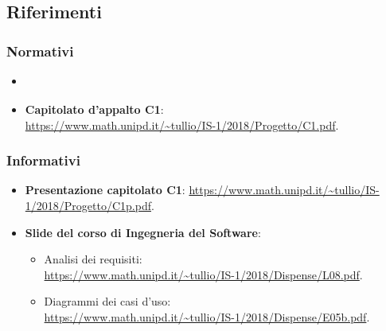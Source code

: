 	\subsection{Riferimenti}

	\subsubsection{Normativi}
	\begin{itemize}
		\item \textbf{\textit{\NdPv}}
		\item \textbf{Capitolato d'appalto C1}:\\ \url{https://www.math.unipd.it/~tullio/IS-1/2018/Progetto/C1.pdf}.
	\end{itemize}

	\subsubsection{Informativi}
	\begin{itemize}
		\item \textbf{Presentazione capitolato C1}: \url{https://www.math.unipd.it/~tullio/IS-1/2018/Progetto/C1p.pdf}.
		\item \textbf{Slide del corso di Ingegneria del Software}:
		
		\begin{itemize}
			\item Analisi dei requisiti:\\ \url{https://www.math.unipd.it/~tullio/IS-1/2018/Dispense/L08.pdf}.
			\item Diagrammi dei casi d'uso:\\ \url{https://www.math.unipd.it/~tullio/IS-1/2018/Dispense/E05b.pdf}.
		\end{itemize}
	\end{itemize}